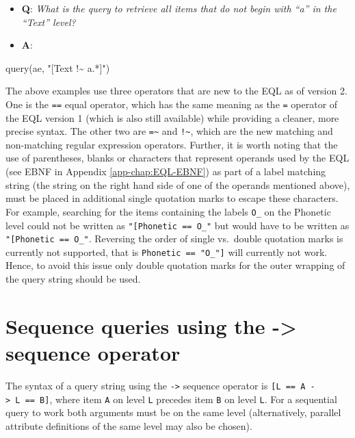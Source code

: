 \documentclass[
]{book}
\newenvironment{Shaded}{\begin{snugshade}}{\end{snugshade}}
\newcommand{\FunctionTok}[1]{\textcolor[rgb]{0.00,0.00,0.00}{#1}}
\newcommand{\NormalTok}[1]{#1}
\newcommand{\StringTok}[1]{\textcolor[rgb]{0.31,0.60,0.02}{#1}}
\providecommand{\tightlist}{%
  \setlength{\itemsep}{0pt}\setlength{\parskip}{0pt}}
\begin{document}
\begin{itemize}
\tightlist
\item
  \textbf{Q}: \emph{What is the query to retrieve all items that do not begin with ``a'' in the ``Text'' level?}
\item
  \textbf{A}:
\end{itemize}

\begin{Shaded}
\begin{Highlighting}[]
\FunctionTok{query}\NormalTok{(ae, }\StringTok{"[Text !\textasciitilde{} a.*]"}\NormalTok{)}
\end{Highlighting}
\end{Shaded}

The above examples use three operators that are new to the EQL as of version 2. One is the \texttt{==} equal operator, which has the same meaning as the \texttt{=} operator of the EQL version 1 (which is also still available) while providing a cleaner, more precise syntax. The other two are \texttt{=\textasciitilde{}} and \texttt{!\textasciitilde{}}, which are the new matching and non-matching regular expression operators. Further, it is worth noting that the use of parentheses, blanks or characters that represent operands used by the EQL (see EBNF in Appendix \ref{app-chap:EQL-EBNF}) as part of a label matching string (the string on the right hand side of one of the operands mentioned above), must be placed in additional single quotation marks to escape these characters. For example, searching for the items containing the labels \texttt{O\_\textquotesingle{}} on the Phonetic level could not be written as \texttt{"{[}Phonetic\ ==\ O\_\textquotesingle{}{]}"} but would have to be written as \texttt{"{[}Phonetic\ ==\ \textquotesingle{}O\_\textquotesingle{}\textquotesingle{}{]}"}. Reversing the order of single vs.~double quotation marks is currently not supported, that is \texttt{\textquotesingle{}{[}Phonetic\ ==\ "O\_\textquotesingle{}"{]}\textquotesingle{}} will currently not work. Hence, to avoid this issue only double quotation marks for the outer wrapping of the query string should be used.

\hypertarget{sequence-queries-using-the---sequence-operator}{%
\section{Sequence queries using the -\textgreater{} sequence operator}\label{sequence-queries-using-the---sequence-operator}}

The syntax of a query string using the \texttt{-\textgreater{}} sequence operator is \texttt{{[}L\ ==\ A\ -\textgreater{}\ L\ ==\ B{]}}, where item \texttt{A} on level \texttt{L} precedes item \texttt{B} on level \texttt{L}. For a sequential query to work both arguments must be on the same level (alternatively, parallel attribute definitions of the same level may also be chosen).
\end{document}

